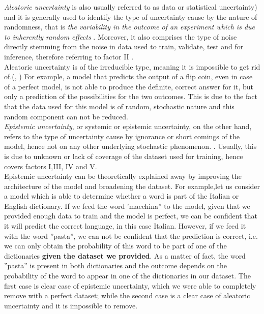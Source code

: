 \textit{Aleatoric uncertainty} is also usually referred to as data or statistical uncertainty) and it is generally used to identify the type of uncertainty cause by the nature of randomness, that is \textit{ the variability in the outcome of an experiment which is due to inherently random effects} \cite{Separation_uncer}. Moreover, it also comprises the type of noise directly stemming from the noise in data used to train, validate, test and for inference, therefore referring to factor II \cite{gawlikowski2021survey} \cite{DBLP:journals/corr/abs-1811-01412}.  \\
Aleatoric uncertainty is of the irreducible type, meaning it is impossible to get rid of.(\cite{DBLP:journals/corr/KendallG17}, \cite{Separation_uncer}) For example, a model that predicts the output of a flip coin, even in case of a perfect model, is not able to produce the definite, correct answer for it, but only a prediction of the possibilities for the two outcomes. This is due to the fact that the data used for this model is of random, stochastic nature and this random component can not be reduced. \cite{Separation_uncer}\\
\textit{Epistemic uncertainty}, or systemic or epistemic uncertainty, on the other hand, refers to the type of uncertainty cause by ignorance or short comings of the model, hence not on any other underlying stochastic phenomenon. \cite{DBLP:journals/corr/abs-1811-01412}. Usually, this is due to unknown or lack of coverage of the dataset used for training, hence covers factors I,III, IV and V. \\
Epistemic uncertainty can be theoretically explained away by improving the architecture of the model and broadening the dataset.
For example,let us consider a model which is able to determine whether a word is part of the Italian or English dictionary. If we feed the word 'macchina'' to the model, given that we provided enough data to train and the model is perfect, we can be confident that it will predict the correct language, in this case Italian. However, if we feed it with the word ''pasta'', we can not be confident that the prediction is correct, i.e. we can only obtain the probability of this word to be part of one of the dictionaries \textbf{given the dataset we provided}. As a matter of fact, the word ''pasta'' is present in both dictionaries and the outcome depends on the probability of the word to appear in one of the dictionaries in our dataset. The first case is clear case of epistemic uncertainty, which we were able to completely remove with a perfect dataset; while the second case is a clear case of aleatoric uncertainty and it is impossible to remove. 
